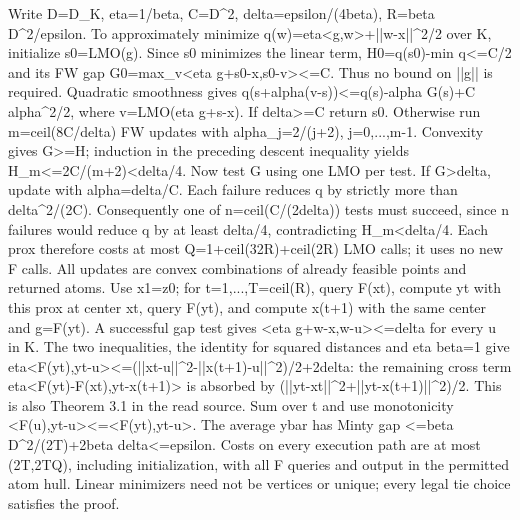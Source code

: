 \documentclass[10pt,a4paper]{article}
\begin{document}
\begingroup\raggedright\sloppy Write D=\allowbreak{}D\_\allowbreak{}K,\allowbreak{} eta=\allowbreak{}1/\allowbreak{}beta,\allowbreak{} C=\allowbreak{}D\textasciicircum{}2,\allowbreak{} delta=\allowbreak{}epsilon/\allowbreak{}(4beta),\allowbreak{} R=\allowbreak{}beta D\textasciicircum{}2/\allowbreak{}epsilon. To approximately minimize q(w)=\allowbreak{}eta<g,\allowbreak{}w>+||w-x||\textasciicircum{}2/\allowbreak{}2 over K,\allowbreak{} initialize s0=\allowbreak{}LMO(g). Since s0 minimizes the linear term,\allowbreak{} H0=\allowbreak{}q(s0)-min q<=\allowbreak{}C/\allowbreak{}2 and its FW gap G0=\allowbreak{}max\_\allowbreak{}v<eta g+s0-x,\allowbreak{}s0-v><=\allowbreak{}C. Thus no bound on ||g|| is required. Quadratic smoothness gives q(s+alpha(v-s))<=\allowbreak{}q(s)-alpha G(s)+C alpha\textasciicircum{}2/\allowbreak{}2,\allowbreak{} where v=\allowbreak{}LMO(eta g+s-x). If delta>=\allowbreak{}C return s0. Otherwise run m=\allowbreak{}ceil(8C/\allowbreak{}delta) FW updates with alpha\_\allowbreak{}j=\allowbreak{}2/\allowbreak{}(j+2),\allowbreak{} j=\allowbreak{}0,\allowbreak{}...,\allowbreak{}m-1. Convexity gives G>=\allowbreak{}H;\allowbreak{} induction in the preceding descent inequality yields H\_\allowbreak{}m<=\allowbreak{}2C/\allowbreak{}(m+2)<delta/\allowbreak{}4. Now test G using one LMO per test. If G>delta,\allowbreak{} update with alpha=\allowbreak{}delta/\allowbreak{}C. Each failure reduces q by strictly more than delta\textasciicircum{}2/\allowbreak{}(2C). Consequently one of n=\allowbreak{}ceil(C/\allowbreak{}(2delta)) tests must succeed,\allowbreak{} since n failures would reduce q by at least delta/\allowbreak{}4,\allowbreak{} contradicting H\_\allowbreak{}m<delta/\allowbreak{}4. Each prox therefore costs at most Q=\allowbreak{}1+ceil(32R)+ceil(2R) LMO calls;\allowbreak{} it uses no new F calls. All updates are convex combinations of already feasible points and returned atoms. Use x1=\allowbreak{}z0;\allowbreak{} for t=\allowbreak{}1,\allowbreak{}...,\allowbreak{}T=\allowbreak{}ceil(R),\allowbreak{} query F(xt),\allowbreak{} compute yt with this prox at center xt,\allowbreak{} query F(yt),\allowbreak{} and compute x(t+1) with the same center and g=\allowbreak{}F(yt). A successful gap test gives <eta g+w-x,\allowbreak{}w-u><=\allowbreak{}delta for every u in K. The two inequalities,\allowbreak{} the identity for squared distances and eta beta=\allowbreak{}1 give eta<F(yt),\allowbreak{}yt-u><=\allowbreak{}(||xt-u||\textasciicircum{}2-||x(t+1)-u||\textasciicircum{}2)/\allowbreak{}2+2delta:\allowbreak{} the remaining cross term eta<F(yt)-F(xt),\allowbreak{}yt-x(t+1)> is absorbed by (||yt-xt||\textasciicircum{}2+||yt-x(t+1)||\textasciicircum{}2)/\allowbreak{}2. This is also Theorem 3.1 in the read source. Sum over t and use monotonicity <F(u),\allowbreak{}yt-u><=\allowbreak{}<F(yt),\allowbreak{}yt-u>. The average ybar has Minty gap <=\allowbreak{}beta D\textasciicircum{}2/\allowbreak{}(2T)+2beta delta<=\allowbreak{}epsilon. Costs on every execution path are at most (2T,\allowbreak{}2TQ),\allowbreak{} including initialization,\allowbreak{} with all F queries and output in the permitted atom hull. Linear minimizers need not be vertices or unique;\allowbreak{} every legal tie choice satisfies the proof.\par\endgroup
\end{document}

